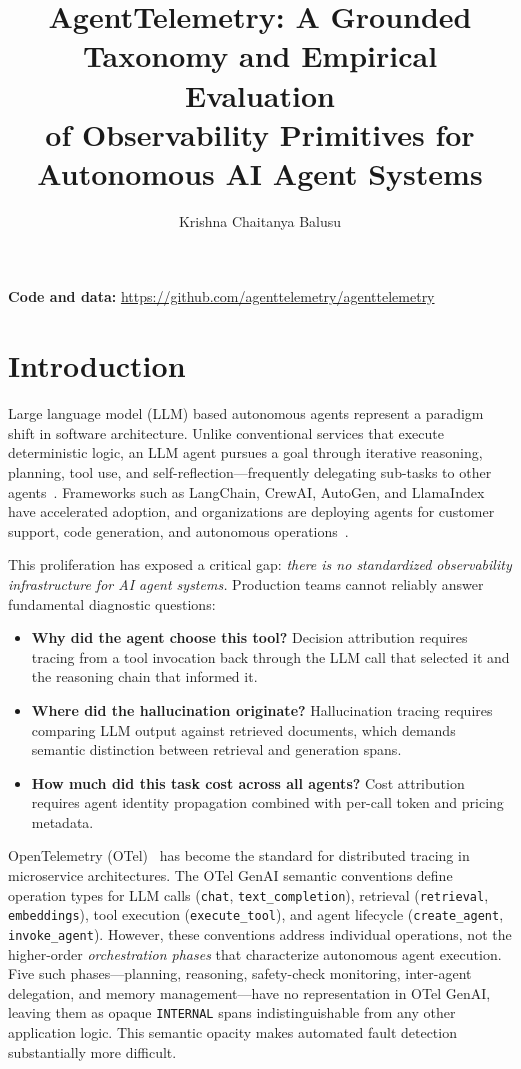 \documentclass[sigplan,10pt,screen]{acmart}
\title{AgentTelemetry: A Grounded Taxonomy and Empirical Evaluation\\of Observability Primitives for Autonomous AI Agent Systems}
\author{Krishna Chaitanya Balusu}
\affiliation{%
  \institution{Independent Researcher}
  \country{United States}
}
\begin{document}
\maketitle

\noindent\textbf{Code and data:} \url{https://github.com/agenttelemetry/agenttelemetry}

\section{Introduction}
\label{sec:introduction}

Large language model (LLM) based autonomous agents represent a paradigm
shift in software architecture.  Unlike conventional services that
execute deterministic logic, an LLM agent pursues a goal through
iterative reasoning, planning, tool use, and
self-reflection---frequently delegating sub-tasks to other
agents~\cite{agentbench,agentboard}.  Frameworks such as LangChain,
CrewAI, AutoGen, and LlamaIndex have accelerated adoption, and
organizations are deploying agents for customer support, code
generation, and autonomous operations~\cite{aiops_survey}.

This proliferation has exposed a critical gap: \emph{there is no
standardized observability infrastructure for AI agent systems.}
Production teams cannot reliably answer fundamental diagnostic
questions:
\begin{itemize}[leftmargin=*,nosep]
\item \textbf{Why did the agent choose this tool?}  Decision
  attribution requires tracing from a tool invocation back through the
  LLM call that selected it and the reasoning chain that informed it.
\item \textbf{Where did the hallucination originate?}  Hallucination
  tracing requires comparing LLM output against retrieved documents,
  which demands semantic distinction between retrieval and generation
  spans.
\item \textbf{How much did this task cost across all agents?}  Cost
  attribution requires agent identity propagation combined with
  per-call token and pricing metadata.
\end{itemize}

OpenTelemetry (OTel)~\cite{otel} has become the standard for
distributed tracing in microservice architectures.  The OTel GenAI
semantic conventions define operation types for LLM calls
(\texttt{chat}, \texttt{text\_completion}), retrieval
(\texttt{retrieval}, \texttt{embeddings}), tool execution
(\texttt{execute\_tool}), and agent lifecycle
(\texttt{create\_agent}, \texttt{invoke\_agent}).  However, these
conventions address individual operations, not the higher-order
\emph{orchestration phases} that characterize autonomous agent
execution.  Five such phases---planning, reasoning, safety-check monitoring,
inter-agent delegation, and memory management---have no representation
in OTel GenAI, leaving them as opaque \texttt{INTERNAL} spans
indistinguishable from any other application logic.  This semantic
opacity makes automated fault detection substantially more difficult.
\end{document}
